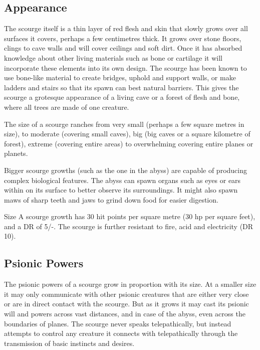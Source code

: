\subsection{Appearance}

The scourge itself is a thin layer of red flesh and skin that slowly grows
over all surfaces it covers, perhaps a few centimetres thick. It grows over
stone floors, clings to cave walls and will cover ceilings and soft dirt.
Once it has absorbed knowledge about other living materials such as bone or
cartilage it will incorporate these elements into its own design. The scourge
has been known to use bone-like material to create bridges, uphold and support
walls, or make ladders and stairs so that its spawn can best natural barriers.
This gives the scourge a grotesque appearance of a living cave or a forest
of flesh and bone, where all trees are made of one creature.

The size of a scourge ranches from very small (perhaps a few square metres in
size), to moderate (covering small caves), big (big caves or a square kilometre
of forest), extreme (covering entire areas) to overwhelming covering entire
planes or planets.

Bigger scourge growths (such as the one in the abyss) are capable of producing
complex biological features. The abyss can spawn organs such as eyes or ears
within on its surface to better observe its surroundings. It might also spawn
maws of sharp teeth and jaws to grind down food for easier digestion.

\begin{35e}{Size}
  A scourge growth has 30 hit points per square metre (30 hp per square feet),
  and a DR of 5/-. The scourge is further resistant to fire, acid and
  electricity (DR 10).
\end{35e}

\subsection{Psionic Powers}

The psionic powers of a scourge grow in proportion with its size. At a smaller
size it may only communicate with other psionic creatures that are either very
close or are in direct contact with the scourge. But as it grows it may cast
its psionic will and powers across vast distances, and in case of the abyss,
even across the boundaries of planes. The scourge never speaks telepathically,
but instead attempts to control any creature it connects with telepathically
through the transmission of basic instincts and desires.

